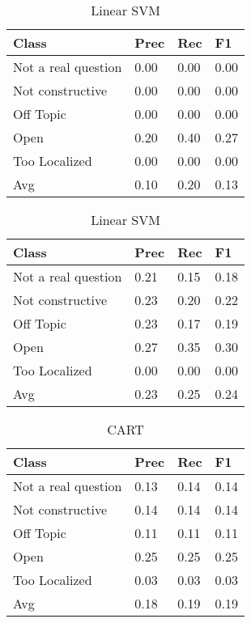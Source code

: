 \begin{table}[!htpb]
\centering
\begin{minipage}{.5\linewidth}
    \begin{tabular}{|l|l|l|l|} \hline
    \textbf{Class}& \textbf{Prec} & \textbf{Rec} & \textbf{F1} \\ \hline
    Not a real question & 0.00      & 0.00   & 0.00     \\
    Not constructive    & 0.00      & 0.00   & 0.00     \\
    Off Topic           & 0.00      & 0.00   & 0.00     \\
    Open                & 0.20      & 0.40   & 0.27     \\
    Too Localized       & 0.00      & 0.00   & 0.00     \\ \hline
    Avg                 & 0.10      & 0.20   & 0.13   \\ \hline  
    \end{tabular}
    \caption{Radial SVM}
    \label{tab3:rsvm}
\end{minipage}%
\begin{minipage}{.5\linewidth}
    \begin{tabular}{|l|l|l|l|} \hline
    \textbf{Class}& \textbf{Prec} & \textbf{Rec} & \textbf{F1} \\ \hline
    Not a real question & 0.21      & 0.15   & 0.18     \\
    Not constructive    & 0.23      & 0.20   & 0.22     \\
    Off Topic           & 0.23      & 0.17   & 0.19     \\
    Open                & 0.27      & 0.35   & 0.30     \\
    Too Localized       & 0.00      & 0.00   & 0.00     \\ \hline
    Avg                 & 0.23      & 0.25   & 0.24   \\ \hline  
    \end{tabular}
    \caption{Linear SVM}
    \label{tab3:lsvm}
\end{minipage}

\end{table}

\begin{table}[!htpb]
\centering
\begin{tabular}{|l|l|l|l|} \hline
\textbf{Class}& \textbf{Prec} & \textbf{Rec} & \textbf{F1} \\ \hline
Not a real question & 0.13      & 0.14   & 0.14     \\
Not constructive    & 0.14      & 0.14   & 0.14     \\
Off Topic           & 0.11      & 0.11   & 0.11     \\
Open                & 0.25      & 0.25   & 0.25     \\
Too Localized       & 0.03      & 0.03   & 0.03     \\ \hline
Avg                 & 0.18      & 0.19   & 0.19   \\ \hline  
\end{tabular}
\caption{CART}
\label{tab3:cart}
\end{table}